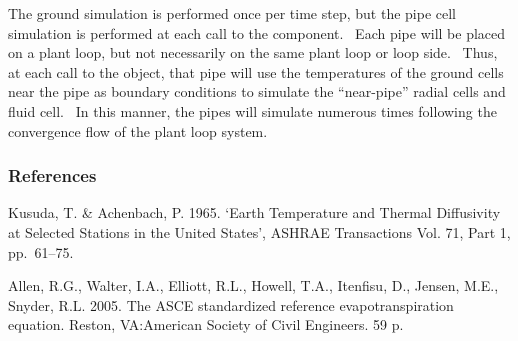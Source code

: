 The ground simulation is performed once per time step, but the pipe cell simulation is performed at each call to the component.~ Each pipe will be placed on a plant loop, but not necessarily on the same plant loop or loop side.~ Thus, at each call to the object, that pipe will use the temperatures of the ground cells near the pipe as boundary conditions to simulate the ``near-pipe'' radial cells and fluid cell.~ In this manner, the pipes will simulate numerous times following the convergence flow of the plant loop system.

\subsubsection{References}\label{references-2-007}

Kusuda, T. \& Achenbach, P. 1965. `Earth Temperature and Thermal Diffusivity at Selected Stations in the United States', ASHRAE Transactions Vol. 71, Part 1, pp.~61--75.

Allen, R.G., Walter, I.A., Elliott, R.L., Howell, T.A., Itenfisu, D., Jensen, M.E., Snyder, R.L. 2005. The ASCE standardized reference evapotranspiration equation. Reston, VA:American Society of Civil Engineers. 59 p.
